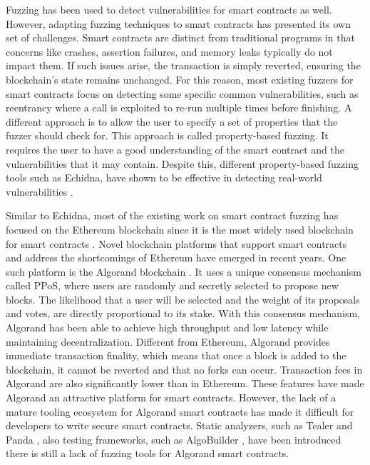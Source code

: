 Fuzzing has been used to detect vulnerabilities for smart contracts as well.
However, adapting fuzzing techniques to smart contracts has presented its own set of challenges.
Smart contracts are distinct from traditional programs in that concerns like crashes, assertion failures, and memory leaks typically do not impact them. If such issues arise, the transaction is simply reverted, ensuring the blockchain's state remains unchanged.
For this reason, most existing fuzzers for smart contracts focus on detecting some specific common vulnerabilities, such as reentrancy where a call is exploited to re-run multiple times before finishing.
A different approach is to allow the user to specify a set of properties that the fuzzer should check for.
This approach is called property-based fuzzing.
It requires the user to have a good understanding of the smart contract and the vulnerabilities that it may contain.
Despite this, different property-based fuzzing tools such as Echidna, have shown to be effective in detecting real-world vulnerabilities \cite{grieco_echidna_2020, noauthor_echidna_nodate}.

Similar to Echidna, most of the existing work on smart contract fuzzing has focused on the Ethereum blockchain since it is the most widely used blockchain for smart contracts \cite{guo_analysis_2022}.
Novel blockchain platforms that support smart contracts and address the shortcomings of Ethereum have emerged in recent years.
One such platform is the Algorand blockchain \cite{chen_algorand_2019}.
It uses a unique consensus mechanism called \ac{PPoS}, where users are randomly and secretly selected to propose new blocks.
The likelihood that a user will be selected and the weight of its proposals and votes, are directly proportional to its stake.
With this consensus mechanism, Algorand has been able to achieve high throughput and low latency while maintaining decentralization.
Different from Ethereum, Algorand provides immediate transaction finality, which means that once a block is added to the blockchain, it cannot be reverted and that no forks can occur.
Transaction fees in Algorand are also significantly lower than in Ethereum.
These features have made Algorand an attractive platform for smart contracts.
However, the lack of a mature tooling ecosystem for Algorand smart contracts has made it difficult for developers to write secure smart contracts.
Static analyzers, such as Tealer \cite{noauthor_crytictealer_nodate} and Panda \cite{sun_panda_2023}, also testing frameworks, such as AlgoBuilder \cite{noauthor_algo_nodate}, have been introduced there is still a lack of fuzzing tools for Algorand smart contracts.

